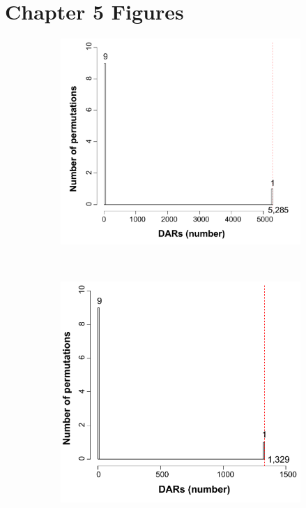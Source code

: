 \section{Chapter 5 Figures}

\bigskip
\begin{figure}[htbp]
\centering
\begin{subfigure}[b]{0.45\textwidth}
\centering 
\includegraphics[width=\textwidth]{./Appendix/pdfs/Chapter5/ATAC_PsA_CD14_permutation_analysis}
\caption{}
\end{subfigure}
~
\begin{subfigure}[b]{0.45\textwidth}
\centering 
\includegraphics[width=\textwidth]{./Appendix/pdfs/Chapter5/ATAC_PsA_CD4_permutation_analysis}

\end{subfigure}
\end{figure}
